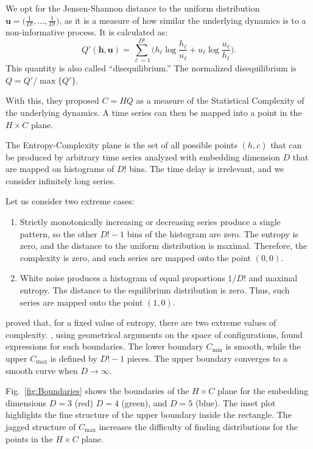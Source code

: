 \documentclass[12pt]{article}
\begin{document}
	We opt for the Jensen-Shannon distance to the uniform distribution $\bm{u} = \big(\frac{1}{D!}, \dots, \frac{1}{D!}\big)$, as it is a measure of how similar the underlying dynamics is to a non-informative process.
	It is calculated as:
	\begin{equation}
		Q'(\bm{h}, \bm{u}) = \sum_{\ell=1}^{D!} \Big(h_\ell \log\frac{h_\ell}{u_\ell} +
		u_\ell \log\frac{u_\ell}{h_\ell}
		\Big).
	\end{equation}
	This quantity is also called ``disequilibrium.''
	The normalized disequilibrium is $ Q=Q'/\max\{Q'\}$.
	
	With this, they proposed $C=HQ$ as a measure of the Statistical Complexity of the underlying dynamics.
	A time series can then be mapped into a point in the $H\times C$ plane.
	
	The Entropy-Complexity plane is the set of all possible points $(h,c)$ that can be produced by arbitrary time series analyzed with embedding dimension $D$ that are mapped on histograms of $D!$ bins.
	The time delay is irrelevant, and we consider infinitely long series.
	
	Let us consider two extreme cases:
	\begin{enumerate}[label=Case~\Roman*., align=left, leftmargin=*]
		\item 	Strictly monotonically increasing or decreasing series produce a single pattern, so the other $D!-1$ bins of the histogram are zero. 
		The entropy is zero, and the distance to the uniform distribution is maximal. 
		Therefore, the complexity is zero, and such series are mapped onto the point $(0,0)$.
		\item 	White noise produces a histogram of equal proportions $1/D!$ and maximal entropy. 
		The distance to the equilibrium distribution is zero. 
		Thus, such series are mapped onto the point $(1,0)$.
	\end{enumerate}
	
	\citet{SomeFeaturesoftheLMCStatisticalComplexity} proved that, for a fixed value of entropy, there are two extreme values of complexity.
	\citet{martin2006generalized}, using geometrical arguments on the space of configurations, found expressions for such boundaries.
	The lower boundary $C_{\min}$ is smooth, while the upper $C_{\max}$ is defined by $D!-1$ pieces.
	The upper boundary converges to a smooth curve when $D\to\infty$.
	
	
	Fig.~\ref{fig:Boundaries} shows the boundaries of the $H\times C$ plane for the embedding dimensions $D=3$ (red) $D=4$ (green), and $D=5$ (blue).
	The inset plot highlights the fine structure of the upper boundary inside the rectangle.
	The jagged structure of $C_{\max}$ increases the difficulty of finding distributions for the points in the $H\times C$ plane.
	
\end{document}
